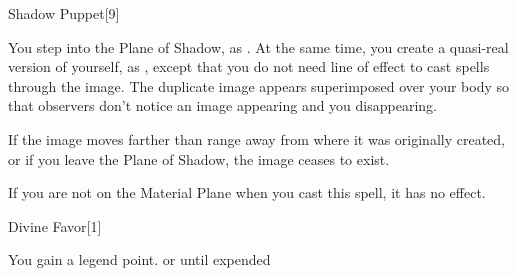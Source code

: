 \begin{spellfooter}
\begin{spellsection}{Shadow Puppet}[9]
    \begin{spellheader}
    \end{spellheader}
    \begin{spellcontent}
        \begin{spelltargetinginfo}
            \spellrng{\rngmed}
        \end{spelltargetinginfo}
        \begin{spelleffects}
            \spelleffect You step into the Plane of Shadow, as . At the same time, you create a quasi-real version of yourself, as , except that you do not need line of effect to cast spells through the image. The duplicate image appears superimposed over your body so that observers don't notice an image appearing and you disappearing.
            \spelldur \durshort
        \end{spelleffects}
    \end{spellcontent}
    \begin{spellfooter}
        \spellnotes If the image moves farther than \rnglong range away from where it was originally created, or if you leave the Plane of Shadow, the image ceases to exist.

        If you are not on the Material Plane when you cast this spell, it has no effect.
        \miscastexplode
    \end{spellfooter}
\end{spellsection}


\begin{spellsection}{Divine Favor}[1]
    \begin{spellheader}
    \end{spellheader}
    \begin{spellcontent}
        \begin{spelltargetinginfo}
        \end{spelltargetinginfo}
        \begin{spelleffects}
            \spelleffect You gain a legend point.
            \spelldur \durshort or until expended
        \end{spelleffects}
    \end{spellcontent}
    \begin{spellfooter}
        \miscastexplode
    \end{spellfooter}
\end{spellsection}


\end{spellfooter}
